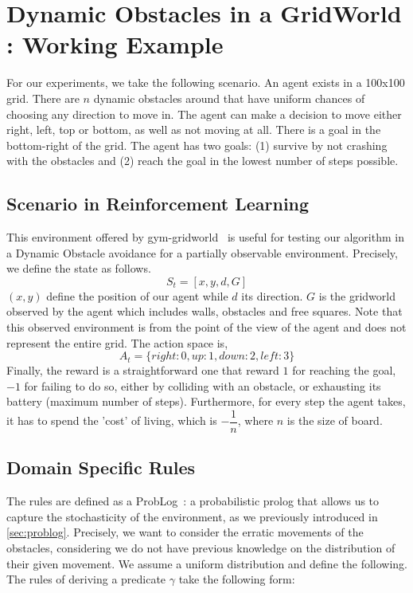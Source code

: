\section{Dynamic Obstacles in a GridWorld : Working Example} 
\label{gridworlddyn}
For our experiments, we take the following scenario. An agent exists in a 100x100 grid. 
There are $n$ dynamic obstacles around that have uniform chances of choosing any direction to move in. 
The agent can make a decision to move either right, left, top or bottom, as well as not moving at all. 
There is a goal in the bottom-right of the grid. The agent has two goals: (1) survive by not crashing with the obstacles and (2) reach the goal in the lowest number of steps possible. 

\subsection{Scenario in Reinforcement Learning}

This environment offered by gym-gridworld~\cite{gym_minigrid} is useful for testing our algorithm in a Dynamic Obstacle avoidance for a partially observable 
environment. Precisely, we define the state as follows. 
\begin{equation*}
  S_t = [x, y, d, G]
\end{equation*}
$(x,y)$ define the position of our agent while $d$ its direction. $G$
is the gridworld observed by the agent which includes walls, obstacles
and free squares. Note that this observed environment is from the point of the view 
of the agent and does not represent the entire grid. 
The action space is, 
\begin{equation*}
  A_t = \{ right: 0, up: 1, down: 2, left: 3 \}
\end{equation*}
Finally, the reward is a straightforward one that reward $1$ for reaching the goal, $-1$ for failing to do so, either by colliding with an obstacle, 
or exhausting its battery (maximum number of steps). Furthermore, for every step the agent takes, it has to spend the 'cost' of living, which is $-\dfrac{1}{n}$, where $n$ is the size of board.


\subsection{Domain Specific Rules}
The rules are defined as a ProbLog~\cite{problog}: a probabilistic prolog that allows us to capture 
the stochasticity of the environment, as we previously introduced in \ref{sec:problog}. Precisely, we want to consider the erratic movements of the obstacles, considering 
we do not have previous knowledge on the distribution of their given movement. We assume a uniform distribution and define the following. 
The rules of \dio{} deriving a predicate $\gamma$ take the following form: 

